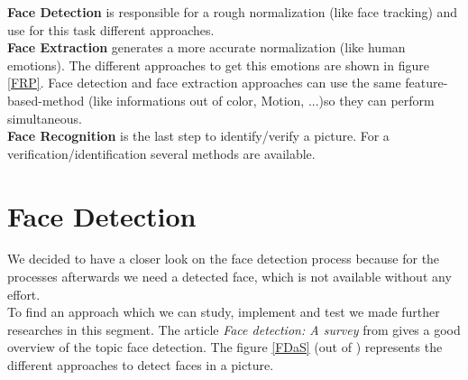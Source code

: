 \documentclass[Bachelorarbeit.tex]{subfiles}
\begin{document}
\textbf{Face Detection} is responsible for a rough normalization (like face tracking) and use for this task different approaches.\\
\textbf{Face Extraction} generates a more accurate normalization (like human emotions). The different approaches to get this emotions are shown in figure \ref{FRP}. Face detection and face extraction approaches can use the same feature-based-method (like informations out of color, Motion, ...)so they can perform simultaneous. \\
\textbf{Face Recognition} is the last step to identify/verify a picture. For a verification/identification several methods are available.


\section{Face Detection}
We decided to have a closer look on the face detection process because for the processes afterwards we need a detected face, which is not available without any effort.
\\To find an approach which we can study, implement and test we made further researches in this segment. The article \textit{Face detection: A survey} from \cite{FDASurvey} gives a good overview of the topic face detection. The figure \ref{FDaS} (out of \cite{FDASurvey}) represents the different approaches to detect faces in a picture.\\
\end{document}
